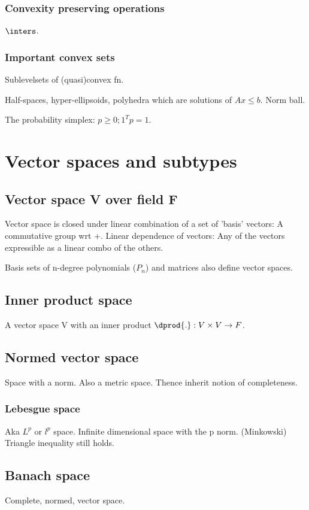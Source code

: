 \documentclass[oneside, article]{memoir}
\begin{document}
\subsection{Convexity preserving operations}
$\inters$.

\subsection{Important convex sets}
Sublevelsets of (quasi)convex fn.

Half-spaces, hyper-ellipsoids, polyhedra which are solutions of $Ax \leq b$. Norm ball.

The probability simplex: $p \geq 0; 1^{T}p = 1$.

\chapter{Vector spaces and subtypes}
\section{Vector space V over field F}
Vector space is closed under linear combination of a set of 'basis' vectors: A commutative group wrt +. Linear dependence of vectors: Any of the vectors expressible as a linear combo of the others.

Basis sets of n-degree polynomials ($P_n$) and matrices also define vector spaces.

\section{Inner product space}
A vector space V with an inner product $\dprod{.}:V\times V \to F$.

\section{Normed vector space}
Space with a norm. Also a metric space. Thence inherit notion of completeness.

\subsection{Lebesgue space}
Aka $L^{p}$ or $l^{p}$ space. Infinite dimensional space with the p norm. (Minkowski) Triangle inequality still holds.

\section{Banach space}
Complete, normed, vector space.
\end{document}
